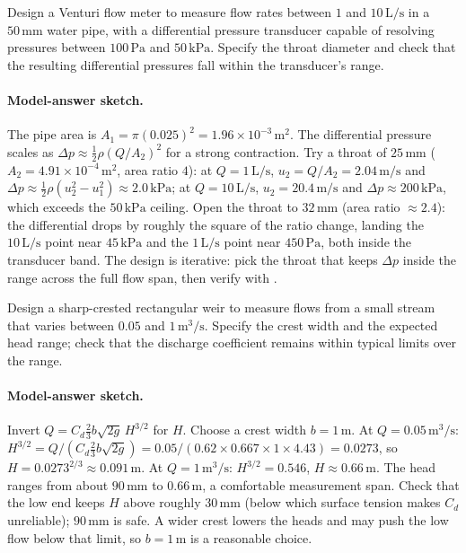 \begin{exercise}
Design a Venturi flow meter to measure flow rates between $1$ and
$10\,\text{L/s}$ in a $50\,\si{\milli\meter}$ water pipe, with a
differential pressure transducer capable of resolving pressures
between $100\,\text{Pa}$ and $50\,\text{kPa}$. Specify the throat
diameter and check that the resulting differential pressures fall
within the transducer's range.

\paragraph{Model-answer sketch.} The pipe area is $A_1 = \pi(0.025)^2
= 1.96\times 10^{-3}\,\si{\meter}^2$. The differential pressure scales
as $\Delta p \approx \tfrac12\rho(Q/A_2)^2$ for a strong contraction.
Try a throat of $25\,\si{\milli\meter}$ ($A_2 = 4.91\times
10^{-4}\,\si{\meter}^2$, area ratio $4$): at $Q = 1\,\text{L/s}$, $u_2
= Q/A_2 = 2.04\,\si{\meter\per\second}$ and $\Delta p \approx
\tfrac12\rho(u_2^2 - u_1^2) \approx 2.0\,\text{kPa}$; at $Q =
10\,\text{L/s}$, $u_2 = 20.4\,\si{\meter\per\second}$ and $\Delta p
\approx 200\,\text{kPa}$, which exceeds the $50\,\text{kPa}$ ceiling.
Open the throat to $32\,\si{\milli\meter}$ (area ratio $\approx 2.4$):
the differential drops by roughly the square of the ratio change,
landing the $10\,\text{L/s}$ point near $45\,\text{kPa}$ and the
$1\,\text{L/s}$ point near $450\,\text{Pa}$, both inside the
transducer band. The design is iterative: pick the throat that keeps
$\Delta p$ inside the range across the full flow span, then verify
with .
\end{exercise}

\begin{exercise}
Design a sharp-crested rectangular weir to measure flows from a
small stream that varies between $0.05$ and $1\,\text{m}^3\text{
/s}$. Specify the crest width and the expected head range; check
that the discharge coefficient remains within typical limits over
the range.

\paragraph{Model-answer sketch.} Invert $Q = C_d\tfrac23 b\sqrt{2g}\,
H^{3/2}$ for $H$. Choose a crest width $b = 1\,\si{\meter}$. At $Q =
0.05\,\si{\meter\cubed\per\second}$: $H^{3/2} = Q/(C_d\tfrac23 b
\sqrt{2g}) = 0.05/(0.62\times 0.667\times 1\times 4.43) = 0.0273$, so
$H = 0.0273^{2/3} \approx 0.091\,\si{\meter}$. At $Q =
1\,\si{\meter\cubed\per\second}$: $H^{3/2} = 0.546$, $H \approx
0.66\,\si{\meter}$. The head ranges from about $90\,\si{\milli\meter}$
to $0.66\,\si{\meter}$, a comfortable measurement span. Check that the
low end keeps $H$ above roughly $30\,\si{\milli\meter}$ (below which
surface tension makes $C_d$ unreliable); $90\,\si{\milli\meter}$ is
safe. A wider crest lowers the heads and may push the low flow below
that limit, so $b = 1\,\si{\meter}$ is a reasonable choice.
\end{exercise}


